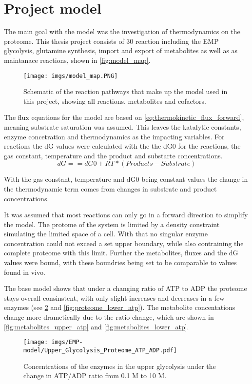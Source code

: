\section{Project model}
The main goal with the model was the investigation of thermodynamics on the proteome. 
This thesis project consists of 30 reaction including the EMP glycolysis, glutamine synthesis, import and export of metabolites as well as as maintanace reactions, shown in \ref{fig:model_map}. 
\begin{figure}[H]
    \centering
    \texttt{[image: imgs/model\_map.PNG]}
    \caption{Schematic of the reaction pathways that make up the model used in this project, showing all reactions, metabolites and cofactors.}
    \label{fig:SActive}
\end{figure}

The flux equations for the model are based on \ref{eq:thermokinetic_flux_forward}, meaning substrate saturation was assumed. This leaves the katalytic constants, enzyme concetration and thermodynamics as the impacting variables.
For reactions the dG values were calculated with the the dG0 for the reactions, the gas constant, temperature and the product and substarte concentrations.
\begin{equation}
    dG == dG0 + RT * (Products - Substrate)
    \label{eq:general_dG}
\end{equation}

With the gas constant, temperature and dG0 being constant values the change in the thermodynamic term comes from changes in substrate and product concentrations. 

It was assumed that most reactions can only go in a forward direction to simplify the model. 
The protome of the system is limited by a density constraint simulating the limited space of a cell. With that no singular enzyme concentration could not exceed a set upper boundary, while also contraining the complete proteome with this limit.
Further the metabolites, fluxes and the dG values were bound, with these boundries being set to be comparable to values found in vivo. 

The base model shows that under a changing ratio of ATP to ADP the proteome stays overall consinstent, with only slight increases and decreases in a few enzymes (see \ref{fig:proteome_upper_atp} and \ref{fig:proteome_lower_atp}). The metabolite concentations change more drametically due to the ratio change, which are shown in \ref{fig:metabolites_upper_atp} and \ref{fig:metabolites_lower_atp}. 
\begin{figure}[H]
    \centering
    \texttt{[image: imgs/EMP-model/Upper\_Glycolysis\_Proteome\_ATP\_ADP.pdf]}
    \caption{Concentrations of the enzymes in the upper glycolysis under the change in ATP/ADP ratio from 0.1 M to 10 M.}
    \label{fig:proteome_upper_atp}
\end{figure}

